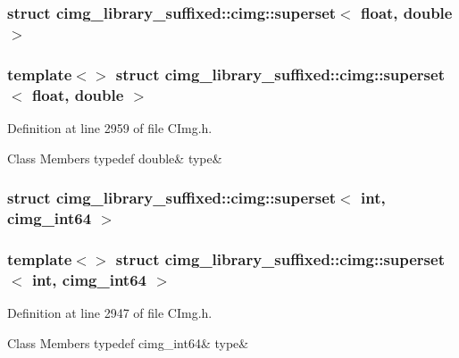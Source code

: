 \subsubsection{struct cimg\+\_\+library\+\_\+suffixed\+:\+:cimg\+:\+:superset$<$ float, double $>$}
\subsubsection*{template$<$$>$\newline
struct cimg\+\_\+library\+\_\+suffixed\+::cimg\+::superset$<$ float, double $>$}



Definition at line 2959 of file C\+Img.\+h.

\begin{DoxyFields}{Class Members}
\mbox{\label{namespacecimg__library__suffixed_1_1cimg_aa718bce8121fc62d8c666639d1f251e1}} 
typedef double&
type&
\\
\hline

\end{DoxyFields}
\label{structcimg__library__suffixed_1_1cimg_1_1superset_3_01int_00_01cimg__int64_01_4}
\subsubsection{struct cimg\+\_\+library\+\_\+suffixed\+:\+:cimg\+:\+:superset$<$ int, cimg\+\_\+int64 $>$}
\subsubsection*{template$<$$>$\newline
struct cimg\+\_\+library\+\_\+suffixed\+::cimg\+::superset$<$ int, cimg\+\_\+int64 $>$}



Definition at line 2947 of file C\+Img.\+h.

\begin{DoxyFields}{Class Members}
\mbox{\label{namespacecimg__library__suffixed_1_1cimg_a6eddf3cd71806d37f55691cc02af0095}} 
typedef cimg\_int64&
type&
\\
\hline

\end{DoxyFields}
\label{structcimg__library__suffixed_1_1cimg_1_1superset_3_01int_00_01cimg__uint64_01_4}
